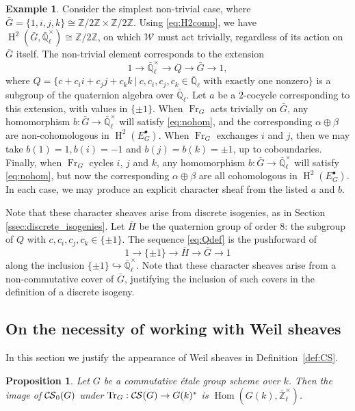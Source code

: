 \documentclass[10pt]{amsart}
\theoremstyle{plain}
\newtheorem{proposition}[theorem]{Proposition}
\theoremstyle{definition}
\newtheorem{example}[theorem]{Example}
\newcommand{\ZZ}{{\mathbb{Z}}}
\newcommand{\EE}{\mathbb{\bar Q}_\ell}
\newcommand{\Fq}{k}
\newcommand{\EEx}{\EE^\times}
\newcommand{\ZEx}{\mathbb{\bar Z}_\ell^\times}
\newcommand{\Weil}[1]{\mathcal{W}_{#1}}
\newcommand{\Frob}[1]{\operatorname{Fr}_{#1}}
\DeclareMathOperator{\Hom}{Hom}
\DeclareMathOperator{\Hh}{H}
\newcommand{\tq}{{\ \vert\ }}
\newcommand{\TrFrob}[1]{\operatorname{Tr}_{#1}}
\newcommand{\CS}{{\mathcal{C\hskip-0.8pt S}}}
\newcommand{\bCS}{{\CS_0}}
\newcommand{\bG}{\bar{G}}
\newcommand{\bH}{\bar{H}}
\begin{document}
\begin{example}\label{eg:H2}
Consider the simplest non-trivial case, where $\bG = \{1, i, j, k\} \cong \ZZ/2\ZZ \times \ZZ/2\ZZ.$  Using \eqref{eq:H2comp},
we have $\Hh^2(\bG, \EEx) \cong \ZZ/2\ZZ$, on which $\Weil{}$ must act trivially, regardless of its action on $\bG$ itself.
The non-trivial element corresponds to the extension
\begin{equation} \label{eq:Qdef}
1 \to \EEx \to Q \to \bG \to 1,
\end{equation}
where $Q = \{c + c_ii + c_jj + c_kk \tq c,c_i,c_j,c_k \in \EE \mbox{ with exactly one nonzero}\}$ is a subgroup of the quaternion algebra over $\EE$.
Let $a$ be a $2$-cocycle corresponding to this extension, with values in $\{\pm 1\}$. When $\Frob{G}$ acts trivially on $\bG$,
any homomorphism $b : \bG \to \EEx$ will satisfy \eqref{eq:nohom}, and the corresponding
$\alpha \oplus \beta$ are non-cohomologous in $\Hh^2(E_G^\bullet)$.
When $\Frob{G}$ exchanges $i$ and $j$, then we may take $b(1) = 1, b(i) = -1$ and $b(j) = b(k) = \pm 1$, up to coboundaries.
Finally, when $\Frob{G}$ cycles $i$, $j$ and $k$, any homomorphism $b : \bG \to \EEx$ will satisfy \eqref{eq:nohom},
but now the corresponding $\alpha \oplus \beta$ are all cohomologous in $\Hh^2(E_G^\bullet)$.  In each case, we may produce
an explicit character sheaf from the listed $a$ and $b$.

Note that these character sheaves arise from discrete isogenies, as in Section \ref{ssec:discrete_isogenies}.
Let $\bH$ be the quaternion group of order $8$: the subgroup of $Q$ with $c, c_i, c_j, c_k \in \{\pm 1\}$.
The sequence \eqref{eq:Qdef} is the pushforward of
\[
1 \to \{\pm 1\} \to \bH \to \bG \to 1
\]
along the inclusion $\{\pm 1\} \hookrightarrow \EEx$.  Note that these character sheaves arise from a non-commutative cover of $\bG$,
justifying the inclusion of such covers in the definition of a discrete isogeny.
\end{example}

\subsection{On the necessity of working with Weil sheaves}\label{ssec:bS}

In this section we justify the appearance of Weil sheaves in Definition~\ref{def:CS}.

\begin{proposition}\label{prop:bounded-etale}
Let $G$ be a commutative \'etale group scheme over $\Fq$.
Then the image of $\bCS(G)$ under $\TrFrob{G} : \CS(G) \to G(\Fq)^*$ is $\Hom(G(\Fq),\ZEx)$.
\end{proposition}
\end{document}
